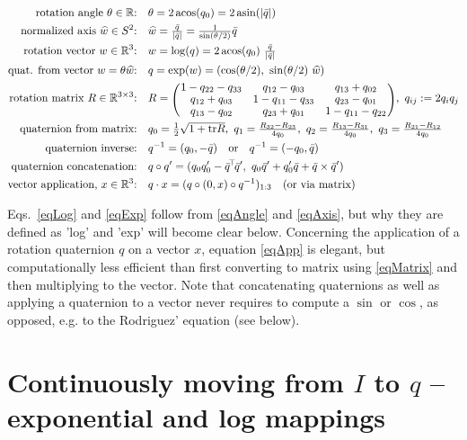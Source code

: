 \begin{align}
\text{rotation angle $\t\in\RRR$:} \quad \label{eqAngle}
& \t = 2 \acos(q_0) = 2\, \text{asin}(|\bar q|) \\
\text{normalized axis $\ul w\in S^2$:} \quad \label{eqAxis}
& \ul w = \Frac{\bar q}{|\bar q|} = \Frac{1}{\sin(\t/2)} \bar q \\
\text{rotation vector $w\in\RRR^3$:} \quad \label{eqLog}
& w = \log(q) = 2 \acos(q_0)~ \Frac{\bar q}{|\bar q|}  \\
\text{quat. from vector $w=\t\ul w$:} \quad \label{eqExp}
& q = \exp(w) = (\cos(\t/2),~ \sin(\t/2)~ \ul w) \\
\text{rotation matrix $R\in\RRR^{3\times 3}$:} \quad \label{eqMatrix}
& R
= \mat{ccc}{
    1-q_{22}-q_{33} & q_{12}-q_{03} &    q_{13}+q_{02} \\
    q_{12}+q_{03} &   1-q_{11}-q_{33} &  q_{23}-q_{01} \\
    q_{13}-q_{02} &   q_{23}+q_{01} &    1-q_{11}-q_{22}
    },~ q_{ij} := 2 q_i q_j \\
\text{quaternion from matrix:} \quad
& q_0 = \Frac12 \sqrt{1+\tr R},~
  q_1 = \Frac{R_{32}-R_{23}}{4 q_0},~
  q_2 = \Frac{R_{13}-R_{31}}{4 q_0},~
  q_3 = \Frac{R_{21}-R_{12}}{4 q_0}  \\
\text{quaternion inverse:} \quad
& q^{-1} = (q_0,-\bar q) \quad \text{or} \quad  q^{-1} = (-q_0, \bar q) \\
\text{quaternion concatenation:} \quad &
q \circ q'
 = (q_0 q'_0 - \bar q^\T \bar q',~
    q_0 \bar q' + q'_0 \bar q + \bar q \times \bar q') \\
\text{vector application, $x\in\RRR^3$:} \quad \label{eqApp}
& q \cdot x = (q \circ (0,x) \circ q^{-1})_{1:3} \quad\text{(or via matrix)}
\end{align}

Eqs.~\eqref{eqLog} and \eqref{eqExp} follow from \eqref{eqAngle}
and \eqref{eqAxis}, but why they are defined as 'log' and 'exp' will become clear below. Concerning the application of a rotation quaternion $q$ on a vector
$x$, equation \eqref{eqApp} is elegant, but computationally less
efficient than first converting to matrix using \eqref{eqMatrix} and
then multiplying to the vector. Note that concatenating quaternions as
well as applying a quaternion to a vector never requires to compute
a $\sin$ or $\cos$, as opposed, e.g. to the Rodriguez' equation
(see below).

\section{Continuously moving from $I$ to $q$ -- exponential and log mappings}

